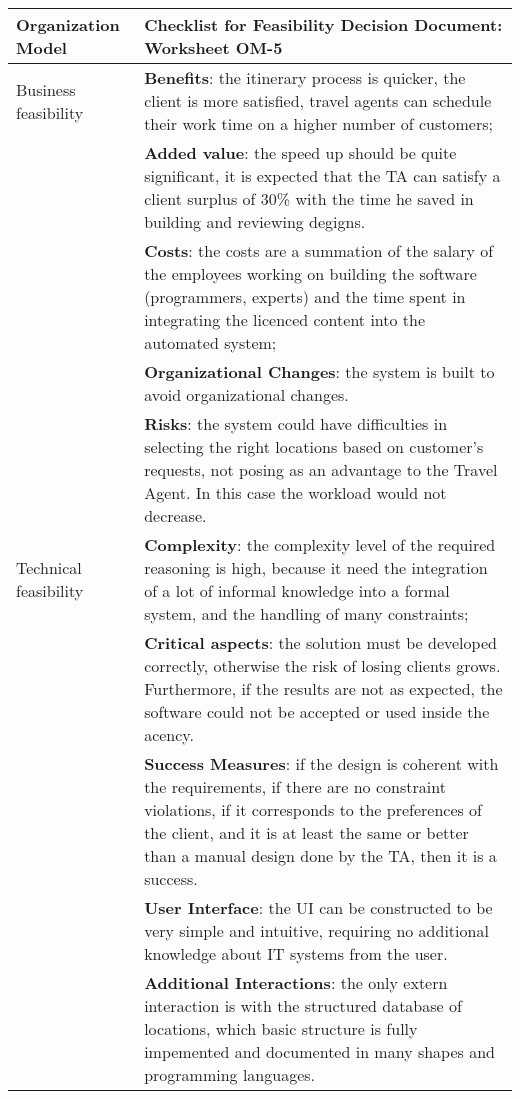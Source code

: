 \begin{tabular}%
       {|p{3cm}%
        |p{9.5cm}|}
\hline
{\bf Organization Model} &
  {\bf Checklist for Feasibility Decision Document: Worksheet OM-5} \\
\hline
\hline
\sc Business feasibility &
   {\rm  \textbf{Benefits}: the itinerary process is quicker, the client is more satisfied, travel agents can schedule their work time on a higher number of customers;} \\
 & {\rm \textbf{Added value}: the speed up should be quite significant, it is expected that the TA can satisfy a client surplus of 30\% with the time he saved in building and reviewing degigns.} \\
 & {\rm \textbf{Costs}: the costs are a summation of the salary of the employees working on building the software (programmers, experts) and the time spent in integrating the licenced content into the automated system;} \\
 & {\rm \textbf{Organizational Changes}: the system is built to avoid organizational changes.} \\
 & {\rm \textbf{Risks}: the system could have difficulties in selecting the right locations based on customer's requests, not posing as an advantage to the Travel Agent. In this case the workload would not decrease.} \\
\hline
\sc Technical feasibility &
   {\rm \textbf{Complexity}: the complexity level of the required reasoning is high, because it need the integration of a lot of informal knowledge into a formal system, and the handling of many constraints;} \\
 & {\rm \textbf{Critical aspects}: the solution must be developed correctly, otherwise the risk of losing clients grows. Furthermore, if the results are not as expected, the software could not be accepted or used inside the acency.} \\
 & {\rm \textbf{Success Measures}: if the design is coherent with the requirements, if there are no constraint violations, if it corresponds to the preferences of the client, and it is at least the same or better than a manual design done by the TA, then it is a success.} \\
 & {\rm \textbf{User Interface}: the UI can be constructed to be very simple and intuitive, requiring no additional knowledge about IT systems from the user. } \\
 & {\rm \textbf{Additional Interactions}: the only extern interaction is with the structured database of locations, which basic structure is fully impemented and documented in many shapes and programming languages.} \\

\end{tabular}
